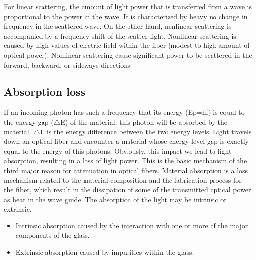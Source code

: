 \documentclass[12pt]{report}
\begin{document}
	For linear scattering, the amount of light power that is transferred from a wave is proportional to the power in the wave. It is characterized by heavy no change in frequency in the scattered wave. On the other hand, nonlinear scattering is accompanied by a frequency shift of the scatter light. Nonlinear scattering is caused by high values of electric field within the fiber (modest to high amount of optical power). Nonlinear scattering cause significant power to be scattered in the forward, backward, or sideways directions
	
	\subsection{Absorption loss}
	If an incoming photon has such a frequency that its energy (Ep=hf) is equal to the energy gap ($\bigtriangleup$E) of the material, this photon will be absorbed by the material. $\bigtriangleup$E is the energy difference between the two energy levels. Light travels down an optical fiber and encounter a material whose energy level gap is exactly equal to the energy of this photons. Obviously, this impact we lead to light absorption, resulting in a loss of light power. This is the basic mechanism of the third major reason for attenuation in optical fibers. Material absorption is a loss mechanism related to the material composition and the fabrication process for the fiber, which result in the dissipation of some of the transmitted optical power as heat in the wave guide. The absorption of the light may be intrinsic or extrinsic.
	\begin{itemize}
			\item Intrinsic absorption caused by the interaction with one or more of the major components of the glass.
			
			\item Extrinsic absorption caused by impurities within the glass.
	\end{itemize}
    
\end{document}
